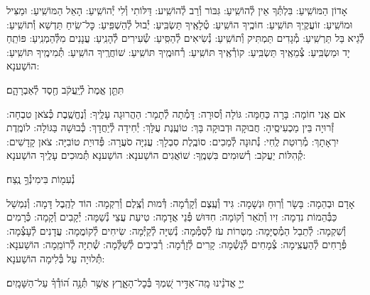 \documentclass[twoside, openany, parskip=half, 11pt]{book}
\begin{document}

אָדוֹן הַמּוֹשִֽׁיעַ: בִּלְתְּ֯ךָ אֵין לְ֯הוֹשִֽׁיעַ: גִּבּוֹר וְ֯רַב לְ֯הוֹשִֽׁיע: דַּלּוֹתִי וְ֯לִי יְ֯הוֹשִֽׁיעַ: הָאֵל הַמּוֹשִֽׁיעַ: וּמַצִּיל וּמוֹשִֽׁיעַ: זוֹעֲקֶֽיךָ תּוֹשִֽׁיעַ: חוֹכֶֽיךָ הוֹשִֽׁיעַ: טְ֯לָאֶֽיךָ תַּשְׂבִּֽיעַ: יְ֯בוּל לְ֯הַשְׁפִּֽיעַ: כׇּל־שִֽׂיחַ תַּדְשֵׁא וְ֯תוֹשִֽׁיעַ: לְ֯גֵיא בַּל תַּרְשִֽׁיעַ: מְ֯גָדִים תַּמְתִּיק וְ֯תוֹשִֽׁיעַ: נְ֯שִׂיאִים לְ֯הַסִּֽיעַ: שְׂ֯עִירִים לְ֯הָנִֽיעַ: עֲנָנִים מִלְּ֯הַמְנִֽיעַ: פּוֹתֵֽחַ יָד וּמַשְׂבִּֽיעַ: צְ֯מֵאֶֽיךָ תַּשְׂבִּֽיעַ: קוֹרְ֯אֶֽיךָ תּוֹשִֽׁיעַ: רְ֯חוּמֶֽיךָ תּוֹשִֽׁיעַ:
שׁוֹחֲרֶֽיךָ הוֹשִֽׁיעַ:
תְּ֯מִימֶֽיךָ תּוֹשִֽׁיעַ: הוֹשַׁענָא:

תִּתֵּ֤ן אֱמֶת֙ לְ֯יַֽעֲקֹ֔ב חֶ֖סֶד לְ֯אַבְרָהָ֑ם׃


אֹם אֲנִי חוֹמָה: בָּרָה כַּחַמָּה: גּוֹלָה וְ֯סוּרָה: דָּמְ֯תָה לְ֯תָמָר: הַהֲרוּגָה עָלֶֽיךָ: וְ֯נֶחֱשֶֽׁבֶת כְּ֯צֹאן טִבְחָה: זְ֯רוּיָה בֵּין מַכְעִיסֶֽיהָ: חֲבוּקָה וּדְבוּקָה בָּךְ: טוֹעֶֽנֶת עֻלָּךְ: יְ֯חִידָה לְ֯יַחֲדָךְ: כְּ֯בוּשָׁה בַּגּוֹלָה: לוֹמֶֽדֶת יִרְאָתָךְ: מְ֯רֽוּטַת לֶֽחִי: נְ֯תוּנָה לְ֯מַכִים: סוֹבֶֽלֶת סִבְלָךְ: עֲנִיָּה סֹעֲרָה: פְּ֯דוּיַת טוֹבִיָּה: צֹאן קָדָשִׁים: קְ֯הִלּוֹת יַעֲקֹב: רְ֯שׁוּמִים בִּשְׁמֶֽךָ: שׁוֹאֲגִים הוֹשַׁענָא: הוֹשַׁענָא תְּ֯מוּכִים עָלֶֽיךָ הוֹשַׁענָא:

נְ֯עִמ֖וֹת בִּימִינְ֯ךָ֣ נֶֽצַח׃


אָדָם וּבְהֵמָה: בָּשָׂר וְ֯רֽוּחַ וּנְשָׁמָה: גִּיד וְ֯עֶֽצֶם וְ֯קָרְ֯מָה: דְּ֯מוּת וְ֯צֶֽלֶם וְ֯רִקְמָה: הוֹד לַהֶֽבֶל דָּמָה: וְ֯נִמְשַׁל כַּבְּ֯הֵמוֹת נִדְמָה: זִיו וְ֯תֹֽאַר וְ֯קוֹמָה: חִדּוּשׁ פְּ֯נֵי אֲדָמָה: טִיעַת עֲצֵי נְ֯שַׁמָּה: יְ֯קָבִים וְ֯קָמָה: כְּ֯רָמִים וְ֯שִׁקְמָה: לְ֯תֵבֵל הַמְ֯סֻיָּמָה: מִטְרוֹת עֹז לְ֯סַמְּ֯מָה: נְ֯שִׁיָּה לְ֯קַיְּ֯מָה: שִׂיחִים לְ֯קוֹמֲמָה: עֲדָנִים לְ֯עָצְ֯מָה: פְּ֯רָחִים לְ֯הַעֲצִֽימָה: צְ֯מָחִים לְ֯גָשְׁ֯מָה: קָרִים לְ֯זָרְ֯מָה: רְ֯בִיבִים לְ֯שַׁלְּ֯מָה:
שְׁ֯תִיָּה לְ֯רוֹמֵֽמָה: הוֹשַׁענָא:
תְּ֯לוּיָה עַל בְּ֯לִימָה הוֹשַׁענָא:

יְיָ֤ אֲדֹנֵ֗ינוּ מָֽה־אַדִּ֣יר שִׁ֭מְךָ בְּ֯כׇל־הָאָ֑רֶץ אֲשֶׁ֥ר תְּ֯נָ֥ה ה֝וֹדְ֯ךָ֗ עַל־הַשָּׁמָֽיִם׃
\end{document}
